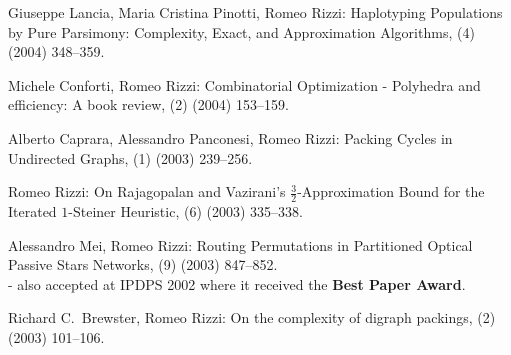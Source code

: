 \begin{etaremune}
  \item {\sc Giuseppe Lancia, Maria Cristina Pinotti, Romeo Rizzi:}
   \newblock  Haplotyping Populations by Pure Parsimony: Complexity, 
              Exact, and Approximation Algorithms,
   (4) (2004) 348--359.

  \item {\sc Michele Conforti, Romeo Rizzi:}  
   \newblock  Combinatorial Optimization
              - Polyhedra and efficiency: A book review,
   (2) (2004) 153--159.

  \item {\sc Alberto Caprara, Alessandro Panconesi, Romeo Rizzi:}
   \newblock  Packing Cycles in Undirected Graphs,
   (1) (2003) 239--256.

  \item {\sc Romeo Rizzi:}
   \newblock  On Rajagopalan and Vazirani's $\frac{3}{2}$-Approximation
              Bound for the Iterated $1$-Steiner Heuristic,
   (6) (2003) 335--338.

  \item {\sc Alessandro Mei, Romeo Rizzi:}
   \newblock  Routing Permutations in Partitioned Optical Passive Stars Networks,
   (9) (2003) 847--852.
   \newblock \\ - also accepted at IPDPS 2002 where it received the {\bf Best Paper Award}.

  \item {\sc Richard C.~Brewster, Romeo Rizzi:}
   \newblock  On the complexity of digraph packings,
   (2) (2003) 101--106.


\end{etaremune}
